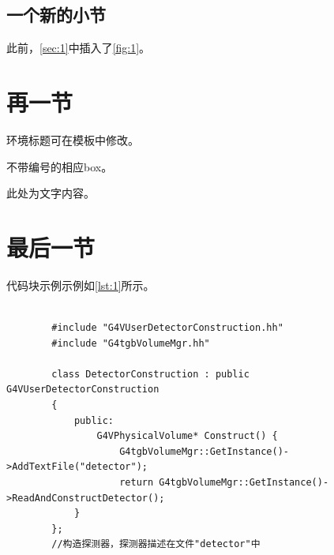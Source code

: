 \documentclass[]{myTemplate}
\begin{document}
		\subsection{一个新的小节}
		此前，\cref{sec:1}中插入了\cref{fig:1}。

	\section{再一节}

		\begin{prob}[一种box示例]
			环境标题可在模板中修改。
		\end{prob}
		\begin{prob*}
            不带编号的相应box。
        \end{prob*}

		\begin{notice}[另一种box示例]
			此处为文字内容。
		\end{notice}

	\section{最后一节}
	代码块示例示例如\cref{lst:1}所示。
    \begin{lstlisting}[caption={sim.cc}, label=lst:1]

        #include "G4VUserDetectorConstruction.hh"
        #include "G4tgbVolumeMgr.hh"
        
        class DetectorConstruction : public G4VUserDetectorConstruction
        {
            public:
                G4VPhysicalVolume* Construct() {
                    G4tgbVolumeMgr::GetInstance()->AddTextFile("detector");
                    return G4tgbVolumeMgr::GetInstance()->ReadAndConstructDetector();
            }
        };
        //构造探测器，探测器描述在文件"detector"中
        
    \end{lstlisting}
\end{document}
